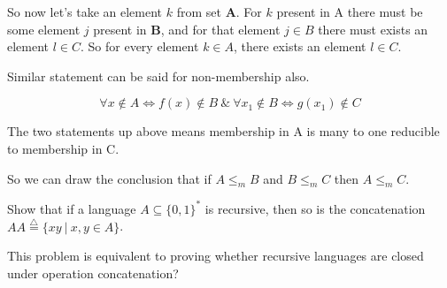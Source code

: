 \documentclass[12pt,a4, onecolumn]{exam}
\begin{document}
\begin{questions}
\begin{solution}
    So now let's take an element $k$ from set \textbf{A}. For $k$ present in A there must be some element $j$ present in \textbf{B}, and for that element $j \in B$ there must exists an element $l \in C$. So for every element $k \in A$, there exists an element $l \in C$.

    Similar statement can be said for non-membership also.

    $$\forall x \notin A \iff f(x) \notin B \:\&\: \forall x_1 \notin B \iff g(x_1) \notin C$$
    
    The two statements up above means membership in A is many to one reducible to membership in C.

    So we can draw the conclusion that if $A \le_m B$ and $B \le_m C$ then $A \le_m C$.
    \end{solution}

    \question Show that if a language $A\subseteq \{0,1\}^*$ is recursive, then so is the concatenation $AA\stackrel{\triangle}{=}\{xy~|~ x,y \in A\}$.

    \begin{solution}
    This problem is equivalent to proving whether recursive languages are closed under operation concatenation?


\end{solution}
\end{questions}
\end{document}
